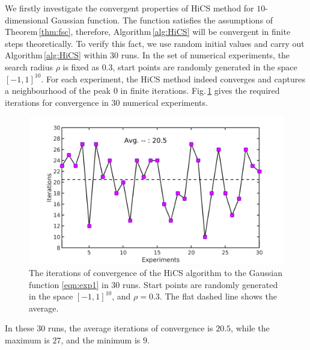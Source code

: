 \documentclass[final,1p,times]{elsarticle}
\begin{document}
We firstly investigate the convergent properties of HiCS
method for $10$-dimensional Gaussian function. 
The function satisfies the assumptions of
Theorem\,\ref{thm:fsc}, therefore, Algorithm\,\ref{alg:HiCS} will
be convergent in finite steps theoretically.
To verify this fact, we use random initial values and carry out
Algorithm\,\ref{alg:HiCS} within $30$ runs.
In the set of numerical experiments, 
the search radius $\rho$ is fixed as $0.3$, start points are
randomly generated in the space $[-1, 1]^{10}$. For each
experiment, the HiCS method indeed converges and
captures a neighbourhood of the peak
$0$ in finite iterations. Fig.\,\ref{fig:exp1:randInit} gives
the required iterations for convergence in $30$ numerical experiments.
\begin{figure}[!htbp]
	\centering
	  \includegraphics[scale=0.2]{../figures/gauss10Drandr0_3.png}
	  \caption{The iterations of convergence of the 
	  HiCS algorithm to the Gaussian function
	  \eqref{eqn:exp1} in $30$ runs. Start points are randomly
	  generated in the space $[-1, 1]^{10}$, and $\rho=0.3$. 
	  The flat dashed line shows the average.} 
	  \label{fig:exp1:randInit}
\end{figure}
In these $30$ runs, the average iterations of convergence is
$20.5$, while the maximum is $27$, and the minimum is $9$.
\end{document}
